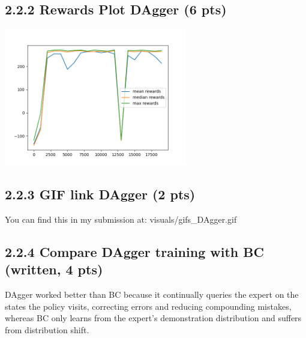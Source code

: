 \documentclass[12pt]{article}
\begin{document}
            
\subsection*{2.2.2 Rewards Plot DAgger (6 pts)}

\begin{tcolorbox}[fit,height=24em, width=40em, blank, borderline={1pt}{1pt},nobeforeafter]
    \begin{center}
        \vspace*{2em}
        \centering
        \includegraphics[width=0.6\textwidth]{visuals/DAgger_rewards.png}
    \end{center}
\end{tcolorbox}

\subsection*{2.2.3 GIF link DAgger (2 pts)}

\begin{tcolorbox}[fit,height=5em, width=40em, blank, borderline={1pt}{1pt},nobeforeafter]
    \vspace*{1em}
    You can find this in my submission at:
    visuals/gifs\_DAgger.gif
\end{tcolorbox}

\subsection*{2.2.4 Compare DAgger training with BC (written, 4 pts)}
\begin{tcolorbox}[fit,height=10em, width=40em, blank, borderline={1pt}{1pt},nobeforeafter]
            \begin{center}
            \vspace*{2em}
            DAgger worked better than BC because it continually queries the expert on the states the policy visits, correcting errors and reducing compounding mistakes, whereas BC only learns from the expert’s demonstration distribution and suffers from distribution shift.
            \end{center}
            \end{tcolorbox}
\end{document}
